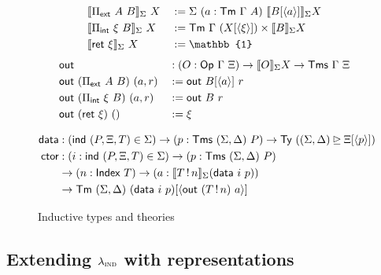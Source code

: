 \begin{figure}[h]
\begin{minipage}[t]{\textwidth}
\begin{alignat*}{2}
  &\llbracket \Pi_{\mta{ext}}\ A\ B \rrbracket_\Sigma\ X &&:= \Sigma\ (a : \Tm\ \Gamma\ A)\ \llbracket B [\langle a \rangle] \rrbracket_\Sigma X \\
  &\llbracket \Pi_{\mta{int}}\ \xi\ B \rrbracket_\Sigma\ X &&:= \Tm\ \Gamma\ (X [\langle \xi \rangle]) \times \llbracket B \rrbracket_\Sigma X \\
  &\llbracket \mta{ret}\ \xi \rrbracket_\Sigma\ X &&:= \mathbb{1}
  \end{alignat*}
  \begin{alignat*}{2}
  &\textsf{out} &&: (O : \textsf{Op}\ \Gamma\ \Xi) \to \llbracket O \rrbracket_\Sigma X \to \textsf{Tms}\ \Gamma\ \Xi \\
  &\textsf{out}\ (\Pi_{\textsf{ext}}\ A\ B)\ (a, r) &&:= \textsf{out}\ B[\langle a \rangle]\ r \\
  &\textsf{out}\ (\Pi_{\textsf{int}}\ \xi\ B)\ (a, r) &&:= \textsf{out}\ B\ r \\
  &\textsf{out}\ (\textsf{ret}\ \xi)\ () &&:= \xi
  \end{alignat*}
  \end{minipage}
  \begin{minipage}[t]{\textwidth}
  \begin{alignat*}{2}
  \mta{data} &: (\mta{ind}\ (P, \Xi, T) \in \Sigma) \to (p : \Tms\ (\Sigma, \Delta)\ P) \to \Ty\ ((\Sigma, \Delta) \unrhd \Xi[\langle p \rangle]) \\
  \mta{ctor} &: (i : \mta{ind}\ (P, \Xi, T) \in \Sigma) \to (p : \Tms\ (\Sigma, \Delta)\ P) \\
    & \to (n : \mta{Index}\ T) \to (a : \llbracket T \, ! \, n \rrbracket_\Sigma (\mta{data}\ i\ p)) \\
    & \to \Tm\ (\Sigma, \Delta)\ (\mta{data}\ i\ p) [\langle \mta{out}\ (T\,!\,n)\ a \rangle]
  \end{alignat*}
  \end{minipage}
  \caption{Inductive types and theories}
  \label{fig:theories}
\end{figure}

\newcommand{\ValidCase}{\mta{ValidCase}}

\subsection{Extending $\lambda_{\textsc{ind}}$ with representations}\label{sub:lambdarep}

